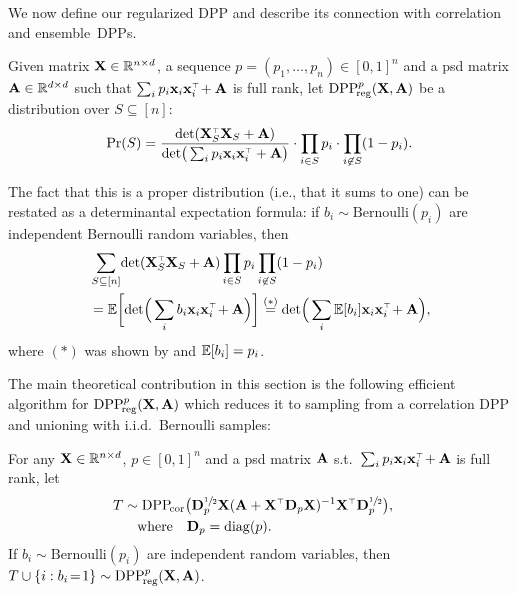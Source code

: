 \documentclass[thesis.tex]{subfiles}
\begin{document}
We now define our regularized DPP and describe its
connection with correlation and ensemble~DPPs.
\begin{definition}\label{d:r-dpp}
Given matrix $\mathbf X\in\mathbb R^{n\times d}$, a sequence  $p=(p_1,\dots,p_n)\in[0,1]^n$
and a psd matrix $\mathbf A\in\mathbb R^{d\times d}$ such that
$\sum_ip_i\x_i\x_i^\top\!+\A$ is
full rank, let
${{\mathrm{DPP}}_{\!\mathrm{reg}}^{p}}(\mathbf X,\mathbf A)$ be a distribution over $S\subseteq [n]$:
  \begin{align}
  \Pr(S) = \frac{\det(
  \X_S^\top\X_S+\A)}{\det\!\big(
 \sum_ip_i\x_i\x_i^\top+ \A\big)}
\cdot \prod_{i\in S}p_{i}\cdot\prod_{i\not\in S}(1-p_i).\label{eq:poisson-prob}
\end{align}
\end{definition}
The fact that this is a proper distribution (i.e., that it sums to
one) can be restated as a determinantal expectation formula: if
$b_i\sim\mathrm{Bernoulli}(p_i)$ are independent Bernoulli random
variables, then
\begin{align*}
  &\sum_{S\subseteq [n]}\!\det(
  \X_S^\top\X_S+\A)\prod_{i\in S}p_{i}\prod_{i\not\in S}(1-p_i) \\
  &=
  \E\bigg[\!\det\!\Big(\sum_ib_i\x_i\x_i^\top\!+\A\Big)\bigg]\overset{(*)}{=}
  \det\!\Big(\sum_i\E[b_i]\x_i\x_i^\top\!+\A\Big),
\end{align*}
where $(*)$ was shown by \cite[Lemma
7]{determinantal-averaging} and $\mathbb E[b_i]=p_i$.

  The main theoretical contribution in this section is the
  following efficient algorithm for ${{\mathrm{DPP}}_{\!\mathrm{reg}}^{p}}(\mathbf X,\mathbf A)$ which reduces it to
  sampling from a correlation DPP and unioning with i.i.d.~Bernoulli samples:
\begin{theorem}\label{t:algorithm}
For any $\mathbf X\in\mathbb R^{n\times d}$, $p\in[0,1]^n$ and a psd matrix $\mathbf A$
s.t.~$\sum_ip_i\x_i\x_i^\top\!+\A$ is
full rank, let
\begin{align*}
  T&\sim\DPPcor\big(\D_p^{\sfrac12}\X(\A+\X^\top\D_p\X)^{-1}\X^\top\D_p^{\sfrac12}\big),
  \quad\\
  &\quad\text{where}\quad\D_p=\diag(p).
\end{align*}
If $b_i\sim\mathrm{Bernoulli}(p_i)$ are independent random variables, then
$T\cup \{i:b_i\!=\!1\}\sim {{\mathrm{DPP}}_{\!\mathrm{reg}}^{p}}(\mathbf X,\mathbf A)$.
\end{theorem}
\end{document}
